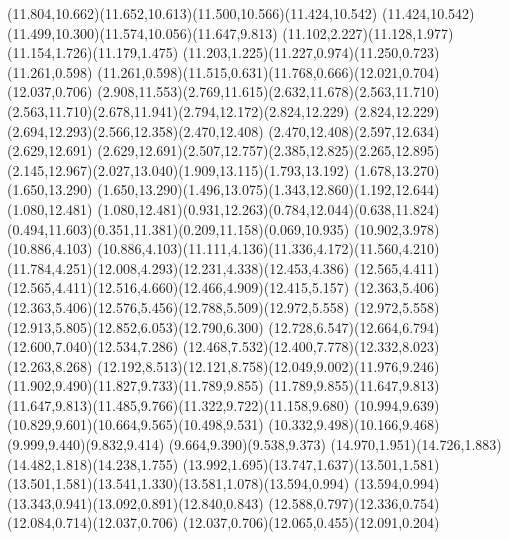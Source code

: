 \documentclass[10pt]{article}
\begin{document}
{{(11.804,10.662)(11.652,10.613)(11.500,10.566)(11.424,10.542)%
\relax
{}(11.424,10.542)(11.499,10.300)(11.574,10.056)(11.647,9.813)%
\relax
{}(11.102,2.227)(11.128,1.977)(11.154,1.726)(11.179,1.475)%
(11.203,1.225)(11.227,0.974)(11.250,0.723)(11.261,0.598)%
\relax
{}(11.261,0.598)(11.515,0.631)(11.768,0.666)(12.021,0.704)%
(12.037,0.706)\relax
{}(2.908,11.553)(2.769,11.615)(2.632,11.678)(2.563,11.710)%
\relax
{}(2.563,11.710)(2.678,11.941)(2.794,12.172)(2.824,12.229)%
\relax
{}(2.824,12.229)(2.694,12.293)(2.566,12.358)(2.470,12.408)%
\relax
{}(2.470,12.408)(2.597,12.634)(2.629,12.691)\relax
{}(2.629,12.691)(2.507,12.757)(2.385,12.825)(2.265,12.895)%
(2.145,12.967)(2.027,13.040)(1.909,13.115)(1.793,13.192)%
(1.678,13.270)(1.650,13.290)\relax
{}(1.650,13.290)(1.496,13.075)(1.343,12.860)(1.192,12.644)%
(1.080,12.481)\relax
{}(1.080,12.481)(0.931,12.263)(0.784,12.044)(0.638,11.824)%
(0.494,11.603)(0.351,11.381)(0.209,11.158)(0.069,10.935)%
\relax
{}(10.902,3.978)(10.886,4.103)\relax
{}(10.886,4.103)(11.111,4.136)(11.336,4.172)(11.560,4.210)%
(11.784,4.251)(12.008,4.293)(12.231,4.338)(12.453,4.386)%
(12.565,4.411)\relax
{}(12.565,4.411)(12.516,4.660)(12.466,4.909)(12.415,5.157)%
(12.363,5.406)\relax
{}(12.363,5.406)(12.576,5.456)(12.788,5.509)(12.972,5.558)%
\relax
{}(12.972,5.558)(12.913,5.805)(12.852,6.053)(12.790,6.300)%
(12.728,6.547)(12.664,6.794)(12.600,7.040)(12.534,7.286)%
(12.468,7.532)(12.400,7.778)(12.332,8.023)(12.263,8.268)%
(12.192,8.513)(12.121,8.758)(12.049,9.002)(11.976,9.246)%
(11.902,9.490)(11.827,9.733)(11.789,9.855)\relax
{}(11.789,9.855)(11.647,9.813)\relax
{}(11.647,9.813)(11.485,9.766)(11.322,9.722)(11.158,9.680)%
(10.994,9.639)(10.829,9.601)(10.664,9.565)(10.498,9.531)%
(10.332,9.498)(10.166,9.468)(9.999,9.440)(9.832,9.414)%
(9.664,9.390)(9.538,9.373)\relax
{}(14.970,1.951)(14.726,1.883)(14.482,1.818)(14.238,1.755)%
(13.992,1.695)(13.747,1.637)(13.501,1.581)\relax
{}(13.501,1.581)(13.541,1.330)(13.581,1.078)(13.594,0.994)%
\relax
{}(13.594,0.994)(13.343,0.941)(13.092,0.891)(12.840,0.843)%
(12.588,0.797)(12.336,0.754)(12.084,0.714)(12.037,0.706)%
\relax
{}(12.037,0.706)(12.065,0.455)(12.091,0.204)\relax
}}
\end{document}
